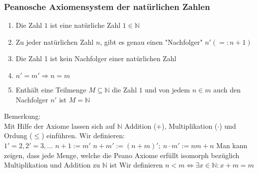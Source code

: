 \documentclass[11pt]{article}
\begin{document}
\subsubsection{Peanosche Axiomensystem der natürlichen Zahlen}
\label{sec-2-4-1}
\begin{enumerate}
\item Die Zahl $1$ ist eine natürliche Zahl $1\in\mathbb{N}$
\item Zu jeder natürlichen Zahl $n$, gibt es genau einen "Nachfolger" $n' (=: n+1)$
\item Die Zahl 1 ist kein Nachfolger einer natürlichen Zahl
\item $n' = m' \Rightarrow n = m$
\item Enthält eine Teilmenge  $M \subseteq \mathbb{N}$ die Zahl $1$ und von jedem $n\in m$ auch den Nachfolger $n'$ ist $M = \mathbb{N}$
\end{enumerate}
Bemerkung: \\
    Mit Hilfe der Axiome lassen sich auf $\mathbb{N}$ Addition ($+$), Multiplikation ($\cdot$) und Ordung ($\leq$) einführen.
Wir definieren: \\
    $1' = 2, 2' = 3, \ldots$
$n + 1 := m'$
$n + m' := (n+m)';~n\cdot m' := n m + n$
Man kann zeigen, dass jede Menge, welche die Peano Axiome erfüllt isomorph bezüglich Multiplikation und Addition zu $\mathbb{N}$ ist
Wir definieren $n < m \Leftrightarrow \exists x\in \mathbb{N}: x + m = m$
\end{document}
